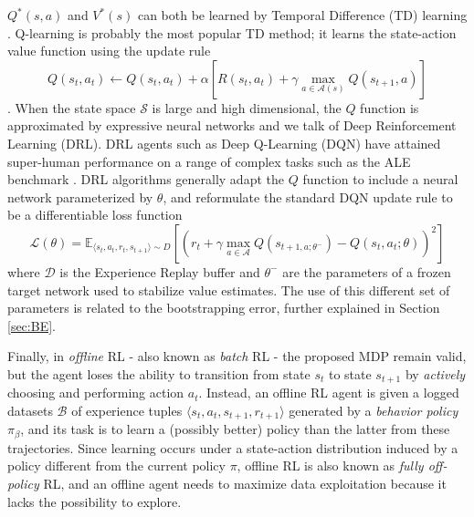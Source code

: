 $Q^*\left(s,a\right)$ and $V^*\left(s\right)$ can both be learned by
Temporal Difference (TD) learning
\citep{sutton1988learning}. Q-learning is probably the most popular TD
method; it learns the state-action value function using the update
rule
\begin{equation}
Q\left(s_t,a_t\right)\leftarrow
Q\left(s_t,a_t\right)+\alpha\left[R(s_t,a_t)+\gamma\max_{a\in\mathcal{A}\left(s\right)}Q\left(s_{t+1},a\right)\right]
\end{equation}
\citep{watkins1992q}. When the state space $\mathcal{S}$ is large and
high dimensional, the $Q$ function is approximated by expressive
neural networks and we talk of Deep Reinforcement Learning
(DRL). DRL agents such as Deep Q-Learning (DQN)
\citep{mnih2013playing} have attained super-human performance on a
range of complex tasks such as the ALE benchmark
\citep{bellemare2013arcade}. DRL algorithms generally adapt the $Q$
function to include a neural network parameterized by $\theta$, and
reformulate the standard DQN update rule to be a differentiable loss
function
\begin{equation}
\mathcal{L}(\theta) = \mathbb{E}_{\langle s_t, a_t, r_t, s_{t+1} \rangle \sim D}\left[(r_t + \gamma
\max_{a\in\mathcal{A}}Q(s_{t+1,a;\theta^{-}}) - Q(s_t, a_t;\theta))^2\right]
\end{equation} where $\mathcal{D}$ is the Experience Replay buffer
\citep{lin1992self} and $\theta^-$ are the parameters of a frozen
target network used to stabilize value estimates. The use of this
different set of parameters is related to the bootstrapping error,
further explained in Section \ref{sec:BE}.

Finally, in \textit{offline} RL - also known as \textit{batch} RL -
the proposed MDP remain valid, but the agent loses the ability to transition
from state $s_t$ to state $s_{t+1}$ by \textit{actively} choosing and
performing action $a_t$. Instead, an offline RL agent is given a
logged datasets $\mathcal{B}$ of experience tuples
$\langle s_t,a_t,s_{t+1},r_{t+1}\rangle$ generated by a \textit{behavior
policy} $\pi_{\beta}$, and its task is to learn a (possibly better)
policy than the latter from these trajectories.
Since learning occurs under a state-action distribution induced by a
policy different from the current policy $\pi$, offline RL is also
known as \textit{fully off-policy} RL, and an offline agent needs to
maximize data exploitation because it lacks the possibility to
explore.